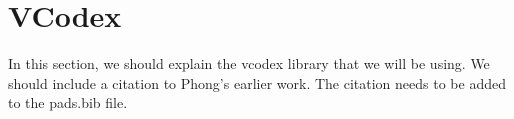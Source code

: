\section{VCodex}
\label{sec:vcodex}

In this section, we should explain the vcodex library that we will be
using.  We should include a citation to Phong's earlier work.  The
citation needs to be added to the pads.bib file.